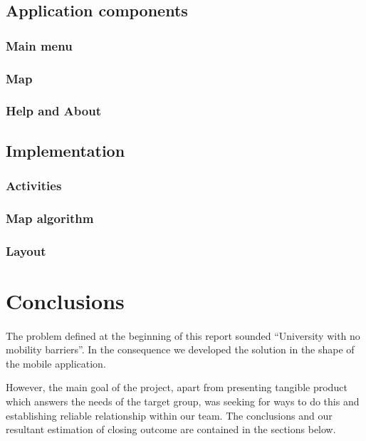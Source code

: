 \documentclass[12pt]{article}
\begin{document}
\subsection{Application components}
\subsubsection{Main menu}
\subsubsection{Map}
\subsubsection{Help and About}

\subsection{Implementation}
\subsubsection{Activities}
\subsubsection{Map algorithm}
\subsubsection{Layout}

\section{Conclusions}
\paragraph{}
The problem defined at the beginning of this report sounded ``University with no mobility barriers''.
In the consequence we developed the solution in the shape of the mobile application.

However, the main goal of the project, apart from presenting tangible product which answers the needs of the target group, was seeking for ways to do this and establishing reliable relationship within our team.
The conclusions and our resultant estimation of closing outcome are contained in the sections below.
\end{document}
